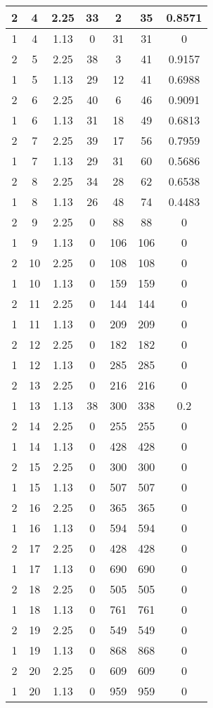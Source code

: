 \documentclass[letterpaper, 12pt]{article}
\begin{document}
\begin{longtable}{|c|c|c|c|c|c|c|}
\hline
2 & 4 & 2.25 & 33 & 2 & 35 & 0.8571 \\
\hline
1 & 4 & 1.13 & 0 & 31 & 31 & 0 \\
\hline
2 & 5 & 2.25 & 38 & 3 & 41 & 0.9157 \\
\hline
1 & 5 & 1.13 & 29 & 12 & 41 & 0.6988 \\
\hline
2 & 6 & 2.25 & 40 & 6 & 46 & 0.9091 \\
\hline
1 & 6 & 1.13 & 31 & 18 & 49 & 0.6813 \\
\hline
2 & 7 & 2.25 & 39 & 17 & 56 & 0.7959 \\
\hline
1 & 7 & 1.13 & 29 & 31 & 60 & 0.5686 \\
\hline
2 & 8 & 2.25 & 34 & 28 & 62 & 0.6538 \\
\hline
1 & 8 & 1.13 & 26 & 48 & 74 & 0.4483 \\
\hline
2 & 9 & 2.25 & 0 & 88 & 88 & 0 \\
\hline
1 & 9 & 1.13 & 0 & 106 & 106 & 0 \\
\hline
2 & 10 & 2.25 & 0 & 108 & 108 & 0 \\
\hline
1 & 10 & 1.13 & 0 & 159 & 159 & 0 \\
\hline
2 & 11 & 2.25 & 0 & 144 & 144 & 0 \\
\hline
1 & 11 & 1.13 & 0 & 209 & 209 & 0 \\
\hline
2 & 12 & 2.25 & 0 & 182 & 182 & 0 \\
\hline
1 & 12 & 1.13 & 0 & 285 & 285 & 0 \\
\hline
2 & 13 & 2.25 & 0 & 216 & 216 & 0 \\
\hline
1 & 13 & 1.13 & 38 & 300 & 338 & 0.2 \\
\hline
2 & 14 & 2.25 & 0 & 255 & 255 & 0 \\
\hline
1 & 14 & 1.13 & 0 & 428 & 428 & 0 \\
\hline
2 & 15 & 2.25 & 0 & 300 & 300 & 0 \\
\hline
1 & 15 & 1.13 & 0 & 507 & 507 & 0 \\
\hline
2 & 16 & 2.25 & 0 & 365 & 365 & 0 \\
\hline
1 & 16 & 1.13 & 0 & 594 & 594 & 0 \\
\hline
2 & 17 & 2.25 & 0 & 428 & 428 & 0 \\
\hline
1 & 17 & 1.13 & 0 & 690 & 690 & 0 \\
\hline
2 & 18 & 2.25 & 0 & 505 & 505 & 0 \\
\hline
1 & 18 & 1.13 & 0 & 761 & 761 & 0 \\
\hline
2 & 19 & 2.25 & 0 & 549 & 549 & 0 \\
\hline
1 & 19 & 1.13 & 0 & 868 & 868 & 0 \\
\hline
2 & 20 & 2.25 & 0 & 609 & 609 & 0 \\
\hline
1 & 20 & 1.13 & 0 & 959 & 959 & 0 \\
\hline
\end{longtable}
\end{document}
